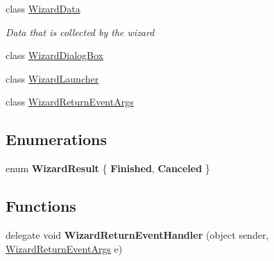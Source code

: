 \begin{DoxyCompactItemize}
class \mbox{\hyperlink{class_wizard_1_1_wizard_data}{Wizard\+Data}}
\begin{DoxyCompactList}\small\item\em Data that is collected by the wizard \end{DoxyCompactList}\item 
class \mbox{\hyperlink{class_wizard_1_1_wizard_dialog_box}{Wizard\+Dialog\+Box}}
\item 
class \mbox{\hyperlink{class_wizard_1_1_wizard_launcher}{Wizard\+Launcher}}
\item 
class \mbox{\hyperlink{class_wizard_1_1_wizard_return_event_args}{Wizard\+Return\+Event\+Args}}
\end{DoxyCompactItemize}
\subsection*{Enumerations}
\begin{DoxyCompactItemize}
\item 
\mbox{\label{namespace_wizard_a47be1134aa95a624853ea9fa9ff8e8fa}} 
enum {\bfseries Wizard\+Result} \{ {\bfseries Finished}, 
{\bfseries Canceled}
 \}
\end{DoxyCompactItemize}
\subsection*{Functions}
\begin{DoxyCompactItemize}
\item 
\mbox{\label{namespace_wizard_a3ea1959d7eb1f3e9248ea47f6b49438a}} 
delegate void {\bfseries Wizard\+Return\+Event\+Handler} (object sender, \mbox{\hyperlink{class_wizard_1_1_wizard_return_event_args}{Wizard\+Return\+Event\+Args}} e)
\end{DoxyCompactItemize}
